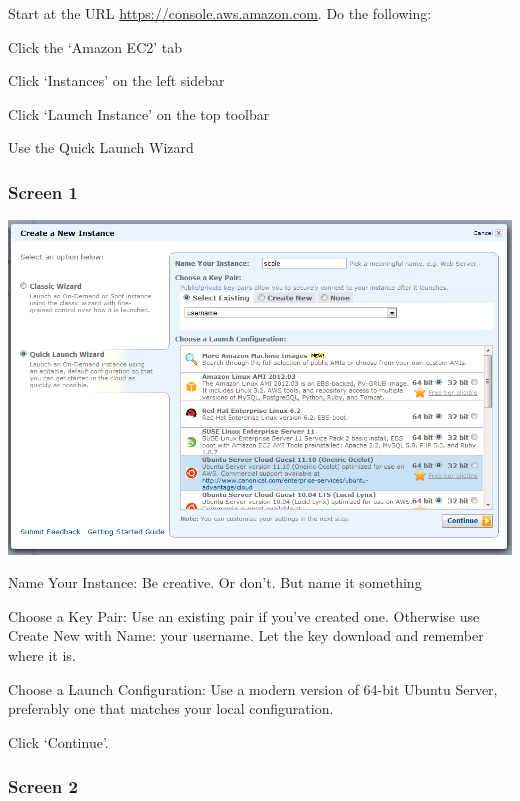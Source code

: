 \documentclass{article}
\begin{document}

Start at the URL \href{https://console.aws.amazon.com}{https://console.aws.amazon.com}. Do the following:

\begin{enumerate*}
\item Click the `Amazon EC2' tab
\item Click `Instances' on the left sidebar
\item Click `Launch Instance' on the top toolbar
\item Use the Quick Launch Wizard
\end{enumerate*}

\subsubsection*{Screen 1}

\includegraphics[width=6in]{screen1}

\begin{enumerate*}
\item Name Your Instance: Be creative. Or don't. But name it something
\item Choose a Key Pair: Use an existing pair if you've created one. Otherwise use Create New with Name: your username. Let the key download and remember where it is.
\item Choose a Launch Configuration: Use a modern version of 64-bit Ubuntu Server, preferably one that matches your local configuration.
\item Click `Continue'.
\end{enumerate*}

\subsubsection*{Screen 2}
\end{document}
